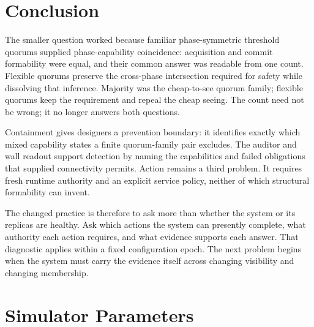 \documentclass[letterpaper,twocolumn,10pt]{article}
\begin{document}
\section{Conclusion}

The smaller question worked because familiar phase-symmetric threshold quorums supplied phase-capability coincidence: acquisition and commit formability were equal, and their common answer was readable from one count. Flexible quorums preserve the cross-phase intersection required for safety while dissolving that inference. Majority was the cheap-to-see quorum family; flexible quorums keep the requirement and repeal the cheap seeing. The count need not be wrong; it no longer answers both questions.

Containment gives designers a prevention boundary: it identifies exactly which mixed capability states a finite quorum-family pair excludes. The auditor and wall readout support detection by naming the capabilities and failed obligations that supplied connectivity permits. Action remains a third problem. It requires fresh runtime authority and an explicit service policy, neither of which structural formability can invent.

The changed practice is therefore to ask more than whether the system or its replicas are healthy. Ask which actions the system can presently complete, what authority each action requires, and what evidence supports each answer. That diagnostic applies within a fixed configuration epoch. The next problem begins when the system must carry the evidence itself across changing visibility and changing membership.




\appendix
\section{Simulator Parameters}
\label{app:params}
\end{document}
